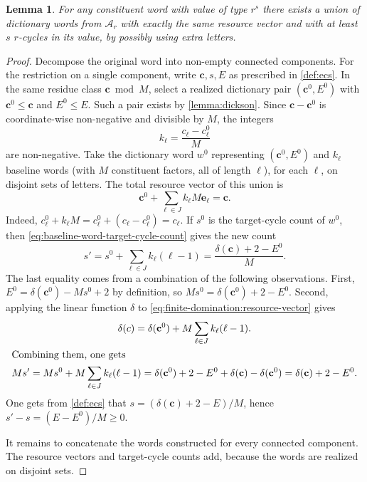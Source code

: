 \documentclass[DIV=12,10pt]{scrartcl}
\newtheorem{lemma}{Lemma}
\theoremstyle{definition}
\newcommand{\cvec}{\mathbf{c}}
\newcommand{\evec}{\mathbf{e}}
\newcommand{\dict}{\mathcal{A}}
\begin{document}
\begin{lemma}
	\label{lemma:finite-domination}
	For any constituent word with value of type $r^s$ there exists a union of dictionary words from $\dict_r$ with exactly the same resource vector and with at least $s$ $r$-cycles in its value, by possibly using extra letters.
\end{lemma}
\begin{proof}
Decompose the original word into non-empty connected components. For the restriction on a single component, write $\cvec, s, E$ as prescribed in \cref{def:ecs}. In the same residue class $\cvec \bmod M$, select a realized dictionary pair $(\cvec^0,E^0)$ with $\cvec^0\leqslant\cvec$ and $E^0\leqslant E$. Such a pair exists by \cref{lemma:dickson}. Since $\cvec-\cvec^0$ is coordinate-wise non-negative and divisible by $M$, the integers
\[
k_\ell = \frac{c_\ell-c^0_\ell}{M}
\]
are non-negative. Take the dictionary word $w^0$ representing $(\cvec^0,E^0)$ and $k_\ell$ baseline words (with $M$ constituent factors, all of length $\ell$), for each $\ell$, on disjoint sets of letters. The total resource vector of this union is
\begin{equation}
	\label{eq:finite-domination:resource-vector}
	\cvec^0 + \sum_{\ell\in J} k_\ell M\evec_\ell = \cvec.
\end{equation}
Indeed, $c^0_\ell + k_\ell M = c^0_\ell + (c_\ell-c^0_\ell) = c_\ell$. If $s^0$ is the target-cycle count of $w^0$, then \cref{eq:baseline-word-target-cycle-count} gives the new count
\[
s' = s^0 + \sum_{\ell\in J} k_\ell(\ell-1) = \frac{\delta(\cvec)+2-E^0}{M}.
\]
The last equality comes from a combination of the following observations. First, $E^0=\delta(\cvec^0)-Ms^0+2$ by definition, so $Ms^0 = \delta(\cvec^0)+2-E^0$. Second, applying the linear function $\delta$ to \cref{eq:finite-domination:resource-vector} gives
\begin{gather*}
	\delta(c) = \delta(\cvec^0) + M\sum_{\ell\in J} k_\ell (\ell-1). \\
	\intertext{Combining them, one gets}
	Ms' = Ms^0 + M\sum_{\ell\in J} k_\ell (\ell-1) = \delta(\cvec^0)+2-E^0 + \delta(\cvec) - \delta(\cvec^0) = \delta(\cvec)+2 - E^0.
\end{gather*}
One gets from \cref{def:ecs} that $s = (\delta(\cvec)+2-E)/M$, hence $s'-s = (E-E^0)/M \geqslant 0$.

It remains to concatenate the words constructed for every connected component. The resource vectors and target-cycle counts add, because the words are realized on disjoint sets.
\end{proof}
\end{document}
